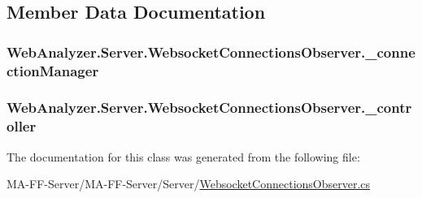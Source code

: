 \subsection{Member Data Documentation}
\hypertarget{class_web_analyzer_1_1_server_1_1_websocket_connections_observer_a12deecceed19d790d4f3a07bb121f519}{}
\subsubsection[{\+\_\+connection\+Manager}]{ Web\+Analyzer.\+Server.\+Websocket\+Connections\+Observer.\+\_\+connection\+Manager\hspace{0.3cm}{\ttfamily [private]}}\label{class_web_analyzer_1_1_server_1_1_websocket_connections_observer_a12deecceed19d790d4f3a07bb121f519}
\hypertarget{class_web_analyzer_1_1_server_1_1_websocket_connections_observer_ac4ce45307e4d81fc6902369aacd6fb0f}{}
\subsubsection[{\+\_\+controller}]{ Web\+Analyzer.\+Server.\+Websocket\+Connections\+Observer.\+\_\+controller\hspace{0.3cm}{\ttfamily [private]}}\label{class_web_analyzer_1_1_server_1_1_websocket_connections_observer_ac4ce45307e4d81fc6902369aacd6fb0f}


The documentation for this class was generated from the following file\+:\begin{DoxyCompactItemize}
\item 
M\+A-\/\+F\+F-\/\+Server/\+M\+A-\/\+F\+F-\/\+Server/\+Server/\hyperlink{_websocket_connections_observer_8cs}{Websocket\+Connections\+Observer.\+cs}\end{DoxyCompactItemize}
